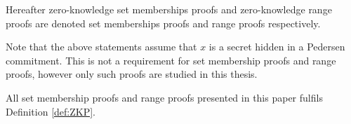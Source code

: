 Hereafter zero-knowledge set memberships proofs and zero-knowledge range proofs are denoted set memberships proofs and range proofs respectively. 

Note that the above statements assume that $x$ is a secret hidden in a Pedersen commitment. This is not a requirement for set membership proofs and range proofs, however only such proofs are studied in this thesis.

All set membership proofs and range proofs presented in this paper fulfils Definition \ref{def:ZKP}.






